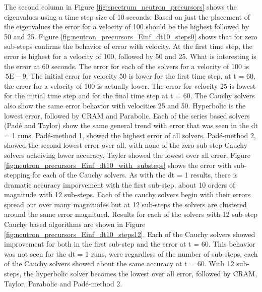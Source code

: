 The second column in Figure \ref{fig:spectrum_neutron_precursors} shows the eigenvalues using a time step size of 10 seconds. Based on just the placement of the eigenvalues the error for a velocity of 100 should be the highest followed by 50 and 25. Figure \ref{fig:neutron_precursors_Einf_dt10_steps0} shows that for zero sub-steps confirms the behavior of error with velocity. At the first time step, the error is highest for a velocity of 100, followed by 50 and 25. What is interesting is the error at 60 seconds. The error for each of the solvers for a velocity of 100 is $~5\text{E}-9$. The initial error for velocity 50 is lower for the first time step, at t = 60, the error for a velocity of 100 is actually lower. The error for velocity 25 is lowest for the initial time step and for the final time step at t = 60. The Cauchy solvers also show the same error behavior with velocities 25 and 50. Hyperbolic is the lowest error, followed by CRAM and Parabolic. Each of the series based solvers (Pad\'e and Taylor) show the same general trend with error that was seen in the dt = 1 runs. Pad\'e-method 1, showed the highest error of all solvers. Pad\'e-method 2, showed the second lowest error over all, with none of the zero sub-step Cauchy solvers acheiving lower accuracy. Tayler showed the lowest over all error. Figure \ref{fig:neutron_precursors_Einf_dt10_with_substeps} shows the error with sub-stepping for each of the Cauchy solvers. As with the dt = 1 results, there is dramatic accuracy imporvement with the first sub-step, about 10 orders of magnitude with 12 sub-steps. Each of the cauchy solvers begin with their errors spread out over many magnitudes but at 12 sub-steps the solvers are clustered around the same error magnitued. Results for each of the solvers with 12 sub-step Cauchy based algorithms are shown in Figure \ref{fig:neutron_precursors_Einf_dt10_steps12}. Each of the Cauchy solvers showed improvement for both in the first sub-step and the error at t = 60. This behavior was not seen for the dt = 1 runs, were regardless of the number of sub-steps, each of the Cauchy solvers showed about the same accuracy at t = 60. With 12 sub-steps, the hyperbolic solver becomes the lowest over all error, followed by CRAM, Taylor, Parabolic and Pad\'e-method 2. 

